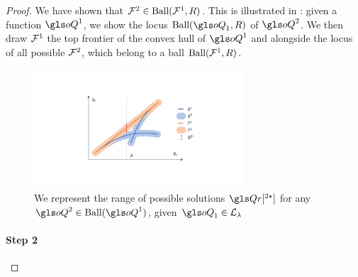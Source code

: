\begin{subappendices}
\begin{proof}


    We have shown that $\mathcal{F}^2 \in \text{Ball}(\mathcal{F}^1, R)$.
    This is illustrated in : given a function $\oQ^1$, we show the locus $\text{Ball}(\oQ_1,R)$ of $\oQ^2$. We then draw $\mathcal{F}^1$ the top frontier of the convex hull of $\oQ^1$ and alongside the locus of all possible $\mathcal{F}^2$, which belong to a ball $\text{Ball}(\mathcal{F}^1, R)$.

    \begin{figure}[ht]
        \centering
        \includegraphics[trim=7cm 4cm 7cm 4cm, clip, width=0.7\textwidth]{img/contraction_lipschitz.pdf}
        \caption{We represent the range of possible solutions $\Qr[^{2\star}]$ for any $\oQ^2\in\text{Ball}(\oQ^1)$, given $\oQ_1\in\cL_\lambda$}
        \label{fig:contraction_lips_hull}
    \end{figure}

    \paragraph{Step 2}


\end{proof}
\end{subappendices}
